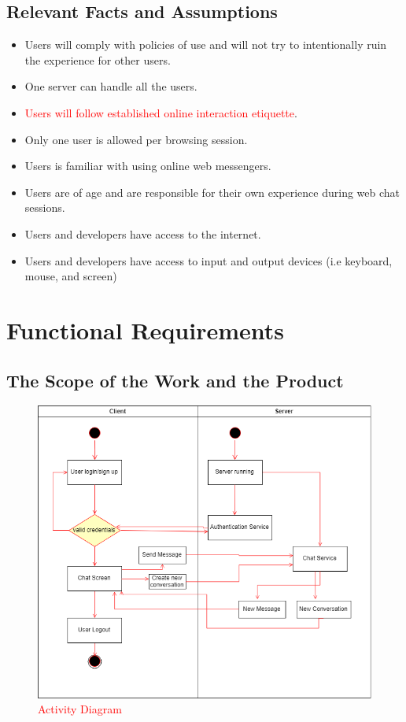 \documentclass[12pt, titlepage]{article}
\begin{document}
    	\subsection{Relevant Facts and Assumptions}
    	\begin{itemize}
    		\item Users will comply with policies of use and will not try to intentionally ruin the experience for other users.
    		\item One server can handle all the users.
    		\item \textcolor{red}{Users will follow established online interaction etiquette}.
    		\item Only one user is allowed per browsing session.
    		\item Users is familiar with using online web messengers.
    		\item Users are of age and are responsible for their own experience during web chat sessions.
    		\item Users and developers have access to the internet.
    		\item Users and developers have access to input and output devices (i.e keyboard, mouse, and screen)
    	\end{itemize}

	
	\newpage
    \section{Functional Requirements}

    	\subsection{The Scope of the Work and the Product}
		\begin{figure}[H]
                \centering
                \includegraphics[scale=0.6]{ActivityDiagram.png}
                \caption{\textcolor{red}{Activity Diagram}}
                \label{fig:my_label}
            \end{figure}
\end{document}
